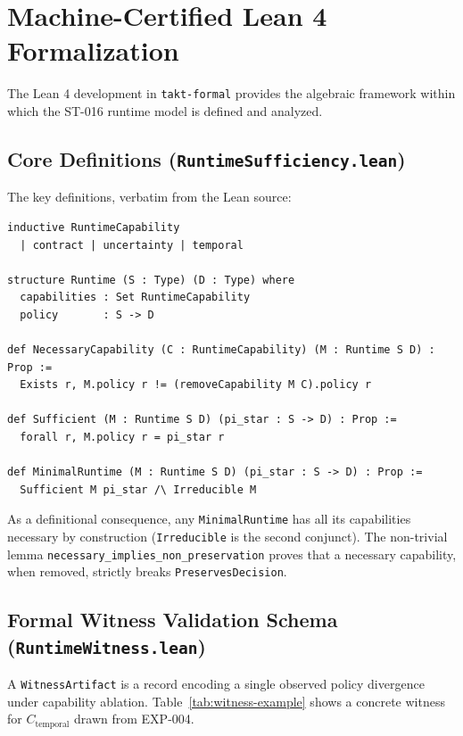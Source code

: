\section{Machine-Certified Lean 4 Formalization}

The Lean 4 development in \texttt{takt-formal} provides the algebraic framework
within which the ST-016 runtime model is defined and analyzed.

\subsection{Core Definitions (\texttt{RuntimeSufficiency.lean})}

The key definitions, verbatim from the Lean source:

\begin{small}
\begin{verbatim}
inductive RuntimeCapability
  | contract | uncertainty | temporal

structure Runtime (S : Type) (D : Type) where
  capabilities : Set RuntimeCapability
  policy       : S -> D

def NecessaryCapability (C : RuntimeCapability) (M : Runtime S D) : Prop :=
  Exists r, M.policy r != (removeCapability M C).policy r

def Sufficient (M : Runtime S D) (pi_star : S -> D) : Prop :=
  forall r, M.policy r = pi_star r

def MinimalRuntime (M : Runtime S D) (pi_star : S -> D) : Prop :=
  Sufficient M pi_star /\ Irreducible M
\end{verbatim}
\end{small}

As a definitional consequence, any \texttt{MinimalRuntime} has all its capabilities
necessary by construction (\texttt{Irreducible} is the second conjunct).
The non-trivial lemma \texttt{necessary\_implies\_non\_preservation} proves that
a necessary capability, when removed, strictly breaks \texttt{PreservesDecision}.

\subsection{Formal Witness Validation Schema (\texttt{RuntimeWitness.lean})}

A \texttt{WitnessArtifact} is a record encoding a single observed policy
divergence under capability ablation. Table~\ref{tab:witness-example} shows
a concrete witness for $C_{\text{temporal}}$ drawn from EXP-004.

